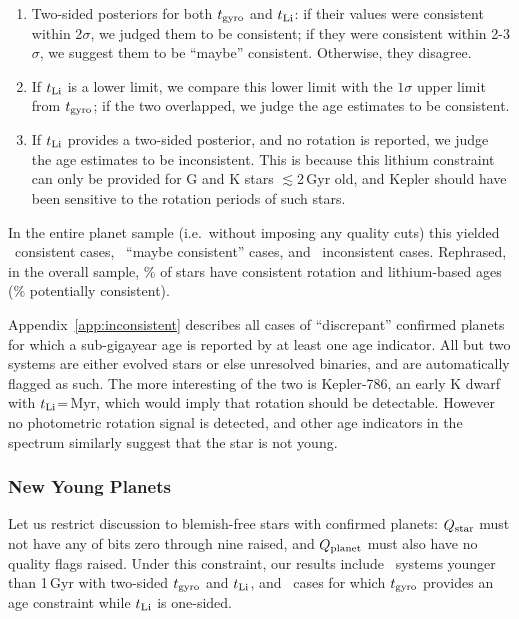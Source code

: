 \documentclass[11pt,twocolumn,tighten]{aastex63}
\begin{document}
\begin{enumerate}[leftmargin=*,topsep=0pt,itemsep=-1ex,partopsep=1ex,parsep=1ex]
  \item Two-sided posteriors for both $t_{\rm gyro}$ and $t_{\rm Li}$:
    if their values were consistent within 2$\sigma$, we judged them
    to be consistent; if they were consistent within 2-3$\sigma$, we
    suggest them to be ``maybe'' consistent.  Otherwise, they
    disagree.
  \item If $t_{\rm Li}$ is a lower limit, we compare this lower limit
    with the $1\sigma$ upper limit from $t_{\rm gyro}$; if the two
    overlapped, we judge the age estimates to be consistent.
  \item If $t_{\rm Li}$ provides a two-sided posterior, and no
    rotation is reported, we judge the age estimates to be
    inconsistent.  This is because this lithium constraint can only be
    provided for G and K stars $\lesssim$2\,Gyr old, and Kepler should
    have been sensitive to the rotation periods of such stars.
\end{enumerate}

In the entire planet sample (i.e.~without imposing any quality cuts) this
yielded \allagesyesconsistent\ consistent cases,
\allagesmaybeconsistent\ ``maybe consistent'' cases, and
\allagesnoconsistent\ inconsistent cases.  Rephrased, in the overall
sample, \fracconsistentallages\% of stars have consistent rotation and
lithium-based ages (\fracpotentiallyconsistentallages\% potentially
consistent).

Appendix~\ref{app:inconsistent} describes all cases of ``discrepant''
confirmed planets for which a sub-gigayear age is reported by at least
one age indicator.  All but two systems are either evolved stars or
else unresolved binaries, and are automatically flagged as such.  The
more interesting of the two is Kepler-786,
an early K dwarf with $t_{\rm
Li}$=\kepseveneightsix\,Myr, which would imply that rotation should be
detectable.  However no photometric rotation signal is detected, and other
age indicators in the spectrum similarly suggest that the star is not
young. 



\subsubsection{New Young Planets}

Let us restrict discussion to blemish-free stars with 
confirmed planets: $Q_{\rm star}$ must not have any of bits zero
through nine raised, and $Q_{\rm planet}$ must also have no quality flags
raised.  Under this constraint, our results include
\ltonegyrhighqconfirmedtwosided\ systems younger than 1\,Gyr with
two-sided $t_{\rm gyro}$ and $t_{\rm Li}$, and
\ltonegyrhighqconfirmedonesided\ cases for which $t_{\rm gyro}$
provides an age constraint while $t_{\rm Li}$ is one-sided.
\end{document}
